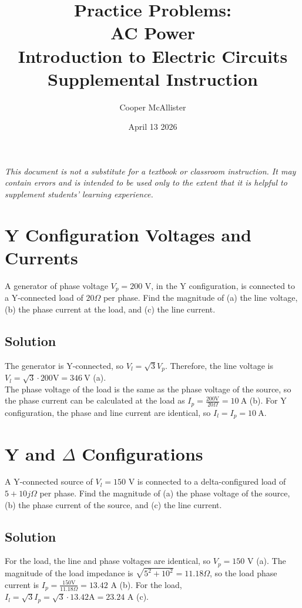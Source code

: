 \documentclass{article}
\title{Practice Problems: \\AC Power \\  \large Introduction to Electric Circuits \\ Supplemental Instruction}
\author{Cooper McAllister}
\date{April 13 2026}
\begin{document}
 {
	\fancyhf{}
	\renewcommand{\headrulewidth}{0pt}
	\renewcommand{\footrulewidth}{0.4pt}
	\fancyfoot[R]{\thepage}
}
\pagestyle{footerstyle}
\maketitle
\thispagestyle{footerstyle}

\begin{center}
\textit{This document is not a substitute for a textbook or classroom instruction. It may contain errors and is intended to be used only to the extent that it is helpful to supplement students' learning experience.}
\end{center}

\section{Y Configuration Voltages and Currents}
A generator of phase voltage $V_p = 200$ V, in the Y configuration, is connected to a Y-connected load of $20\Omega$ per phase. Find the magnitude of (a) the line voltage, (b) the phase current at the load, and (c) the line current.
\subsection*{Solution}
The generator is Y-connected, so $V_l = \sqrt{3}V_p$. Therefore, the line voltage is $V_l = \sqrt{3}\cdot 200 \textrm{V} = 346 \ \textrm{V}$ (a).
\\The phase voltage of the load is the same as the phase voltage of the source, so the phase current can be calculated at the load as $I_p = \frac{200\textrm{V}}{20\Omega} = 10 \ \textrm{A}$ (b). For Y configuration, the phase and line current are identical, so $I_l = I_p = 10 \ \textrm{A}$.

\section{Y and $\Delta$ Configurations}
A Y-connected source of $V_l = 150$ V is connected to a delta-configured load of $5 + 10j \Omega$ per phase. Find the magnitude of (a) the phase voltage of the source, (b) the phase current of the source, and (c) the line current.
\subsection*{Solution}
For the load, the line and phase voltages are identical, so $V_p = 150$ V (a). The magnitude of the load impedance is $\sqrt{5^2 + 10^2} = 11.18 \Omega$, so the load phase current is $I_p = \frac{150\textrm{V}}{11.18\Omega} = 13.42$ A (b). For the load, $I_l = \sqrt{3}I_p = \sqrt{3}\cdot13.42\textrm{A} = 23.24$ A (c).
\end{document}
